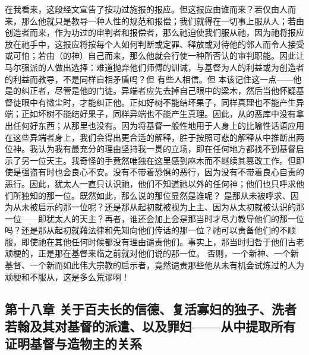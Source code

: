在我看来，这段经文宣告了按功过施报的报应。但这报应由谁而来？若仅由人而来，那么他就只是教导一种人性的规范和报偿；我们就得在一切事上服从人；若由创造者而来，作为功过的审判者和报偿者，那么祂迫使我们服从祂，因为祂将报应放在祂手中，这报应将按每个人如何判断或定罪、释放或对待他的邻人而令人接受或可怕；若由（的神）自己而来，那么他就会行使一种所否认的审判职能。因此让马尔强派的人做出选择：难道抛弃他们师傅的训诫，与基督为人的利益或为创造者的利益而教导，不是同样自相矛盾吗？但 有些人相信。但 本该记住这一点——他是的纠正者，尽管是他的门徒。异端者应先去掉自己眼中的梁木，然后当他怀疑基督徒眼中有微尘时，才能纠正他。正如好树不能结坏果子，同样真理也不能产生异端；正如坏树不能结好果子，同样异端也不能产生真理。因此，从的恶库中没有拿出任何好东西；从那里也没有。因为将基督一般性地用于人身上的比喻性话语应用在这些异端者身上，我们会得出更合适的解释，胜于按照可悲的解释从中推断出两位神。我认为我有最充分的理由坚持我一贯的立场，即在任何地方都找不到基督启示了另一位天主。我奇怪的手竟然唯独在这里感到麻木而不继续其篡改工作。但即使是强盗有时也会良心不安。没有不带着恐惧的恶行，因为没有不带着良心自责的恶行。因此，犹太人一直只认识祂，他们不知道祂以外的任何神；他们也只呼求他们所独知的那一位。既然如此，那么说的那位显然是谁呢？ 是那从未被呼求、因为从未被启示的那一位呢？还是那从起初就被视为上主、因为从太初就被认识的那一位——即犹太人的天主？再者，谁还会加上会是那当时才尽力教导他们的那一位吗？还是那从起初就藉法律和先知向他们传话的那一位？祂可以责备他们的不顺服，即使祂在其他任何时候都没有理由谴责他们。事实上，那当时归咎于他们古老顽梗的，正是那在基督来临之前就对他们说的那一位。 否则，一个新神、一个新基督、一个新而如此伟大宗教的启示者，竟然谴责那些他从未有机会试炼过的人为顽梗和不服从，这是多么荒谬啊！\par


\subsection{第十八章 关于百夫长的信德、复活寡妇的独子、洗者若翰及其对基督的派遣、以及罪妇——从中提取所有证明基督与造物主的关系}

